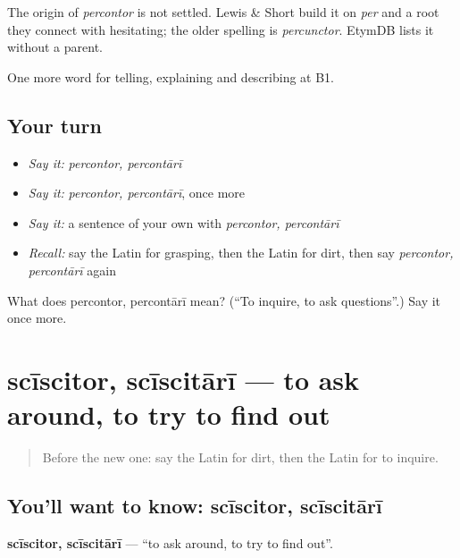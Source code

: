 \begin{cousinweb}
The origin of \emph{percontor} is not settled. Lewis \& Short build it on \emph{per} and a root they connect with hesitating; the older spelling is \emph{percunctor}. EtymDB lists it without a parent.
\end{cousinweb}

\begin{grammarlens}[title={What you've built}]
One more word for telling, explaining and describing at B1.
\end{grammarlens}

\subsection*{Your turn}
\begin{itemize}
\raggedright
  \item \emph{Say it:} \emph{percontor, percontārī}
  \item \emph{Say it:} \emph{percontor, percontārī}, once more
  \item \emph{Say it:} a sentence of your own with \emph{percontor, percontārī}
  \item \emph{Recall:} say the Latin for grasping, then the Latin for dirt, then say \emph{percontor, percontārī} again
\end{itemize}

\begin{tcolorbox}[breakable,colback=teal!4,colframe=teal!35!black,title={Before you move on}]
What does percontor, percontārī mean? (\textquotedblleft{}To inquire, to ask questions\textquotedblright{}.) Say it once more.
\end{tcolorbox}
\section[scīscitor, scīscitārī]{scīscitor, scīscitārī — to ask around, to try to find out}

\label{lesson:LA-C451-sciscitor}



\begin{quote}
Before the new one: say the Latin for dirt, then the Latin for to inquire.
\end{quote}

\subsection*{You'll want to know: scīscitor, scīscitārī}
\textbf{scīscitor, scīscitārī} — \textquotedblleft{}to ask around, to try to find out\textquotedblright{}.

